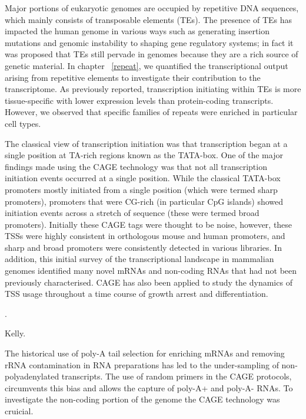 Major portions of eukaryotic genomes are occupied by repetitive DNA sequences, which mainly consists of transposable elements (TEs). The presence of TEs has impacted the human genome in various ways such as generating insertion mutations and genomic instability\cite{pmid19763152,pmid11700292} to shaping gene regulatory systems\cite{pmid18368054}; in fact it was proposed that TEs still pervade in genomes because they are a rich source of genetic material\cite{pmid18368054}. In chapter ~\ref{repeat}, we quantified the transcriptional output arising from repetitive elements to investigate their contribution to the transcriptome. As previously reported, transcription initiating within TEs is more tissue-specific with lower expression levels than protein-coding transcripts\cite{pmid19377475}. However, we observed that specific families of repeats were enriched in particular cell types.

The classical view of transcription initiation was that transcription began at a single position at TA-rich regions known as the TATA-box. One of the major findings made using the CAGE technology was that not all transcription initiation events occurred at a single position\cite{pmid16645617}. While the classical TATA-box promoters mostly initiated from a single position (which were termed sharp promoters), promoters that were CG-rich (in particular CpG islands) showed initiation events across a stretch of sequence (these were termed broad promoters). Initially these CAGE tags were thought to be noise, however, these TSSs were highly consistent in orthologous mouse and human promoters, and sharp and broad promoters were consistently detected in various libraries\cite{pmid16645617}. In addition, this initial survey of the transcriptional landscape in mammalian genomes identified many novel mRNAs and non-coding RNAs that had not been previously characterised\cite{pmid16141072}. CAGE has also been applied to study the dynamics of TSS usage throughout a time course of growth arrest and differentiation\cite{pmid19377474}.

\cite{pmid25218058}.

Kelly\cite{pmid23181609}.

The historical use of poly-A tail selection for enriching mRNAs and removing rRNA contamination in RNA preparations has led to the under-sampling of non-polyadenylated transcripts. The use of random primers in the CAGE protocols, circumvents this bias and allows the capture of poly-A+ and poly-A- RNAs. To investigate the non-coding portion of the genome the CAGE technology was cruicial.

